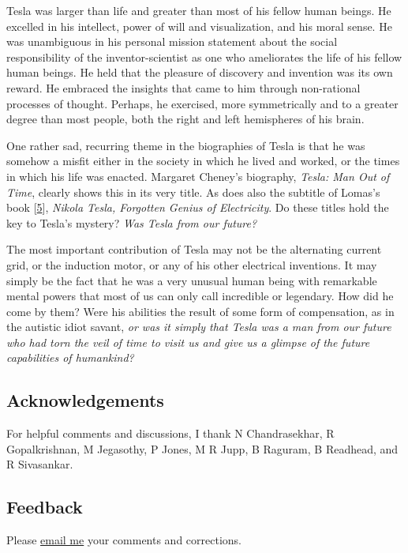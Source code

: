 \documentclass[
  a4paper,
]{article}
\begin{document}
Tesla was larger than life and greater than most of his fellow human
beings. He excelled in his intellect, power of will and visualization,
and his moral sense. He was unambiguous in his personal mission
statement about the social responsibility of the inventor-scientist as
one who ameliorates the life of his fellow human beings. He held that
the pleasure of discovery and invention was its own reward. He embraced
the insights that came to him through non-rational processes of thought.
Perhaps, he exercised, more symmetrically and to a greater degree than
most people, both the right and left hemispheres of his brain.

One rather sad, recurring theme in the biographies of Tesla is that he
was somehow a misfit either in the society in which he lived and worked,
or the times in which his life was enacted. Margaret Cheney's biography,
\emph{Tesla: Man Out of Time}, clearly shows this in its very title. As
does also the subtitle of Lomas's book
{[}\protect\hyperlink{ref-lomas99}{5}{]}, \emph{Nikola Tesla, Forgotten
Genius of Electricity}. Do these titles hold the key to Tesla's mystery?
\emph{Was Tesla from our future?}

The most important contribution of Tesla may not be the alternating
current grid, or the induction motor, or any of his other electrical
inventions. It may simply be the fact that he was a very unusual human
being with remarkable mental powers that most of us can only call
incredible or legendary. How did he come by them? Were his abilities the
result of some form of compensation, as in the autistic idiot savant,
\emph{or was it simply that Tesla was a man from our future who had torn
the veil of time to visit us and give us a glimpse of the future
capabilities of humankind?}

\hypertarget{acknowledgements}{%
\subsection{Acknowledgements}\label{acknowledgements}}

For helpful comments and discussions, I thank N Chandrasekhar, R
Gopalkrishnan, M Jegasothy, P Jones, M R Jupp, B Raguram, B Readhead,
and R Sivasankar.

\hypertarget{feedback}{%
\subsection{Feedback}\label{feedback}}

Please \href{mailto:feedback.swanlotus@gmail.com}{email me} your
comments and corrections.
\end{document}
